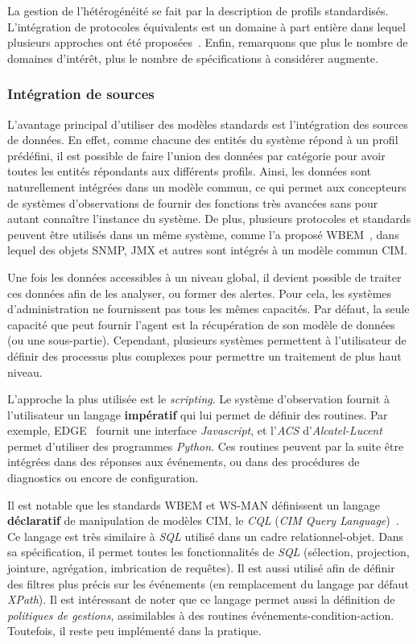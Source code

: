 La gestion de l'hétérogénéité se fait par la description de profils standardisés. L'intégration de protocoles équivalents est un domaine à part entière dans lequel plusieurs approches ont été proposées~\cite{Kaed:these}. Enfin, remarquons que plus le nombre de domaines d'intérêt, plus le nombre de spécifications à considérer augmente.

\subsubsection{Intégration de sources}
L'avantage principal d'utiliser des modèles standards est l'intégration des sources de données. En effet, comme chacune des entités du système répond à un profil prédéfini, il est possible de faire l'union des données par catégorie pour avoir toutes les entités répondants aux différents profils. Ainsi, les données sont naturellement intégrées dans un modèle commun, ce qui permet aux concepteurs de systèmes d'observations de fournir des fonctions très avancées sans pour autant connaître l'instance du système. De plus, plusieurs protocoles et standards peuvent être utilisés dans un même système, comme l'a proposé WBEM~\cite{DMTF:WBEM}, dans lequel des objets SNMP, JMX et autres sont intégrés à un modèle commun CIM.

Une fois les données accessibles à un niveau global, il devient possible de traiter ces données afin de les analyser, ou former des alertes. Pour cela, les systèmes d'administration ne fournissent pas tous les mêmes capacités. Par défaut, la seule capacité que peut fournir l'agent est la récupération de son modèle de données (ou une sous-partie). Cependant, plusieurs systèmes permettent à l'utilisateur de définir des processus plus complexes pour permettre un traitement de plus haut niveau.

L'approche la plus utilisée est le \textit{scripting}. Le système d'observation fournit à l'utilisateur un langage \textbf{impératif} qui lui permet de définir des routines. Par exemple, EDGE~\cite{Motorola:EDGE} fournit une interface \textit{Javascript}, et l'\textit{ACS} d'\textit{Alcatel-Lucent} permet d'utiliser des programmes \textit{Python}. Ces routines peuvent par la suite être intégrées dans des réponses aux événements, ou dans des procédures de diagnostics ou encore de configuration.

Il est notable que les standards WBEM et WS-MAN définissent un langage \textbf{déclaratif} de manipulation de modèles CIM, le \textit{CQL} (\textit{CIM Query Language})~\cite{DMTF:CIM-QL}. Ce langage est très similaire à \textit{SQL} utilisé dans un cadre relationnel-objet. Dans sa spécification, il permet toutes les fonctionnalités de \textit{SQL} (sélection, projection, jointure, agrégation, imbrication de requêtes). Il est aussi utilisé afin de définir des filtres plus précis sur les événements (en remplacement du langage par défaut \textit{XPath}). Il est intéressant de noter que ce langage permet aussi la définition de \textit{politiques de gestions}, assimilables à des routines événements-condition-action. Toutefois, il reste peu implémenté dans la pratique.

